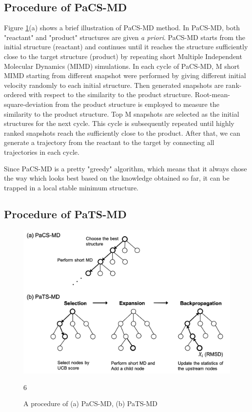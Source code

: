 \subsection{Procedure of PaCS-MD}
Figure \ref{fig:pacs_and_pats_mehtod}(a) shows a brief illustration of PaCS-MD method. In PaCS-MD, both "reactant" and "product" structures are given {\it a priori}. PaCS-MD starts from the initial structure (reactant) and continues until it reaches the structure sufficiently close to the target structure (product) by repeating short Multiple Independent Molecular Dynamics (MIMD) simulations. In each cycle of PaCS-MD, M short MIMD starting from different snapshot were performed by giving different initial velocity randomly to each initial structure. Then generated snapshots are rank-ordered with respect to the similarity to the product structure. Root-mean-square-deviation from the product structure is employed to measure the similarity to the product structure. Top M snapshots are selected as the initial structures  for the next cycle. This cycle is subsequently repeated until highly ranked snapshots reach the sufficiently close to the product. After that, we can generate a trajectory from the reactant to the target by connecting all trajectories in each cycle. 

Since PaCS-MD is a pretty "greedy" algorithm, which means that it always chose the way which looks best based on the knowledge obtained so far, it can be trapped in a local stable minimum structure. 



\subsection{Procedure of PaTS-MD}

\begin{figure}[t]
\centering
\includegraphics[width=15cm]{Figures/pacs_and_pats_method.png}
\caption{A procedure of (a) PaCS-MD, (b) PaTS-MD } 
\label{fig:pacs_and_pats_mehtod}
6\end{figure}

